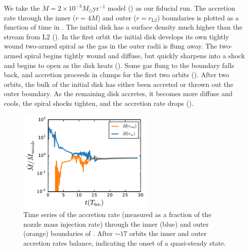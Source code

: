 We take the $\dot{M} = 2 \times 10^{-3} M_\odot \text{yr}^{-1}$ model () as our fiducial run.  The accretion rate through the inner ($r=4 M$) and outer ($r=r_\text{L2}$) boundaries is plotted as a function of time in . The initial disk has a surface density much higher than the stream from L2 ().  In the first orbit the initial disk develops its own tightly wound two-armed spiral as the gas in the outer radii is flung away.  The two-armed spiral begins tightly wound and diffuse, but quickly sharpens into a shock and begins to open as the disk heats ().  Some gas flung to the boundary falls back, and accretion proceeds in clumps for the first two orbits ().  After two orbits, the bulk of the initial disk has either been accreted or thrown out the outer boundary.  As the remaining disk accretes, it becomes more diffuse and cools, the spiral shocks tighten, and the accretion rate drops ().

\begin{figure}
\begin{center}
\includegraphics[width=0.6\textwidth]{figures/minidisk/q011_m3_mdot.pdf}
\end{center}
\caption{ Time series of the accretion rate (measured as a fraction of the nozzle mass injection rate) through the inner (blue) and outer (orange) boundaries of .  After $\sim17$ orbits the inner and outer accretion rates balance, indicating the onset of a quasi-steady state.}
\end{figure}

